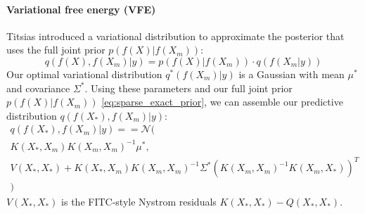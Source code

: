 \paragraph{Variational free energy (VFE)}
Titsias \cite{vfe} introduced a variational distribution to approximate the posterior that uses the full joint prior $p(f(X) | f(X_m))$:
\begin{equation} \label{eq:vfe_posterior}
    q(f(X), f(X_m) | y) = p(f(X) | f(X_m)) \cdot q(f(X_m | y))
\end{equation}
Our optimal variational distribution $q^*(f(X_m) | y)$ is a Gaussian with mean $\mu^*$ and covariance $\Sigma^*$. Using these parameters and our full joint prior $p(f(X) | f(X_m))$ \ref{eq:sparse_exact_prior}, we can assemble our predictive distribution $q(f(X_*), f(X_m) | y)$: 
\begin{equation*}
    \begin{aligned}
        q(f(X_*), f(X_m) | y) = 
        = \mathcal{N}( \\
            K(X_*, X_m) K(X_m, X_m)^{-1} \mu^*, \\
            V(X_*, X_*) + K(X_*, X_m) K(X_m, X_m)^{-1} \Sigma^* \left( K(X_m, X_m)^{-1} K(X_m, X_*) \right)^T \\
        )
    \end{aligned}
\end{equation*}
$V(X_*, X_*)$ is the FITC-style Nystrom residuals $K(X_*, X_*) - Q(X_*, X_*)$.

